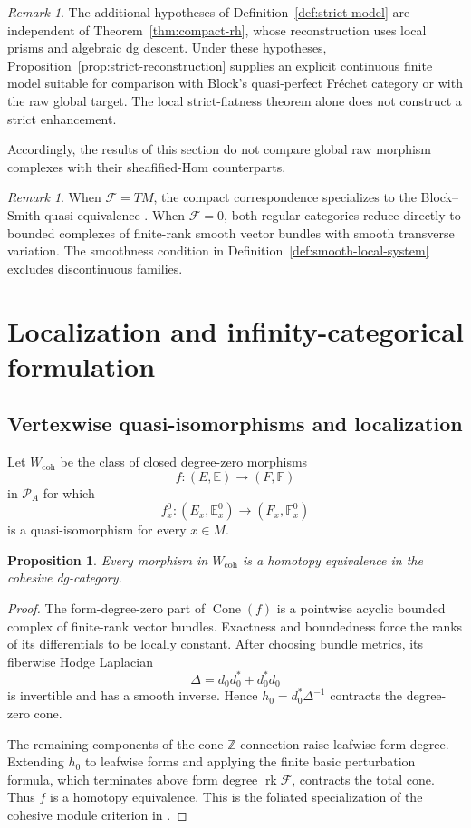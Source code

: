 \documentclass[12pt]{amsart}
\newtheorem{prop}[thm]{Proposition}
\theoremstyle{definition}
\theoremstyle{remark}
\newtheorem{rem}[thm]{Remark}
\numberwithin{equation}{section}
\newcommand{\CF}{{\mathcal F}}
\newcommand{\A}{{A}}
\newcommand{\Z}{{\mathbb{Z}}}
\newcommand{\1}{{\mathbb{1}}}
\newcommand{\rk}{\operatorname{rk}}
\begin{document}
\begin{rem}
The additional hypotheses of
Definition~\ref{def:strict-model} are independent of
Theorem~\ref{thm:compact-rh}, whose reconstruction uses local prisms
and algebraic dg descent.  Under these hypotheses,
Proposition~\ref{prop:strict-reconstruction} supplies an explicit
continuous finite model suitable for comparison with Block's
quasi-perfect Fr\'echet category or with the raw global target.  The
local strict-flatness theorem alone does not construct a strict
enhancement.
\end{rem}

Accordingly, the results of this section do not compare global raw
morphism complexes with their sheafified-Hom counterparts.

\begin{rem}
When $\CF=TM$, the compact correspondence specializes to the
Block--Smith quasi-equivalence \cite[Theorem 4.1]{BS14}.  When
$\CF=0$, both regular categories reduce directly to bounded complexes of
finite-rank smooth vector bundles with smooth transverse variation.
The smoothness condition in Definition~\ref{def:smooth-local-system}
excludes discontinuous families.
\end{rem}

\section{Localization and infinity-categorical formulation}

\subsection{Vertexwise quasi-isomorphisms and localization}

Let $W_{\mathrm{coh}}$ be the class of closed degree-zero morphisms
\[
 f:(E,\mathbb E)\longrightarrow(F,\mathbb F)
\]
in $\mathcal P_{\A}$ for which
\[
 f_x^0:(E_x,\mathbb E_x^0)\longrightarrow
 (F_x,\mathbb F_x^0)
\]
is a quasi-isomorphism for every $x\in M$.

\begin{prop}\label{prop:coh-localization}
Every morphism in $W_{\mathrm{coh}}$ is a homotopy equivalence in the
cohesive dg-category.
\end{prop}

\begin{proof}
The form-degree-zero part of $\operatorname{Cone}(f)$ is a pointwise
acyclic bounded complex of finite-rank vector bundles.  Exactness and
boundedness force the ranks of its differentials to be locally
constant.  After choosing bundle metrics, its fiberwise Hodge
Laplacian
\[
 \Delta=d_0d_0^*+d_0^*d_0
\]
is invertible and has a smooth inverse.  Hence
$h_0=d_0^*\Delta^{-1}$ contracts the degree-zero cone.

The remaining components of the cone $\Z$-connection raise leafwise
form degree.  Extending $h_0$ to leafwise forms and applying the finite
basic perturbation formula, which terminates above form degree
$\rk\CF$, contracts the total cone.  Thus $f$ is a homotopy
equivalence.  This is the foliated specialization of the cohesive
module criterion in \cite[Proposition 2.9]{Blo05}.
\end{proof}
\end{document}
